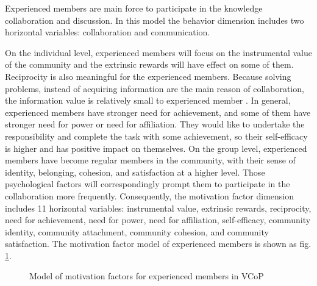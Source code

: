 \documentclass[doublespacing]{elsarticle}
\begin{document}
 Experienced members are main force to
 participate in the knowledge collaboration and discussion. In this model the behavior
 dimension includes two horizontal variables: collaboration and
 communication. 

   On the individual level, experienced members will focus on the
   instrumental value of the community and the extrinsic rewards will
   have effect on some of them. Reciprocity is also meaningful for the
   experienced members. Because 
   solving problems, instead of acquiring information are the main
   reason of collaboration, the information
   value is relatively small to experienced member . In general,
   experienced members have stronger need for achievement, and some of
   them have stronger need for power or need for affiliation. They
   would like to undertake the responsibility and complete the task
   with some achievement, so their self-efficacy is higher and has
   positive impact on themselves. On the group level, experienced
   members have become regular members in the community, with their
   sense of identity, belonging, cohesion, and satisfaction at a
   higher level. Those psychological factors will correspondingly
   prompt them to participate in the collaboration more
   frequently. Consequently, the motivation factor dimension includes
   11 horizontal variables: instrumental value, extrinsic rewards,
   reciprocity, need for achievement, need for power, need for
   affiliation, self-efficacy, community identity, community
   attachment, community cohesion, and community satisfaction. The
   motivation factor model of experienced members is shown as fig. \ref{fig:senior_member}.
\begin{figure}[htpb]
  \centering

  \caption{Model of motivation factors for experienced
    members in VCoP}
  \label{fig:senior_member}
\end{figure}
\end{document}
